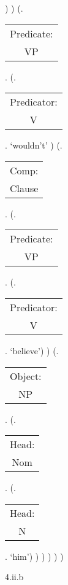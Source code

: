 \documentclass[12pt,letterpaper]{article}
\begin{document}
\begin{figure}
\begin{center}
\begin{parsetree}
			)
			)
			(.\begin{tabular}{c}Predicate:\\VP\end{tabular}.
			(.\begin{tabular}{c}Predicator:\\V\end{tabular}. `{wouldn't}' )
			(.\begin{tabular}{c}Comp:\\Clause\end{tabular}. 
			(.\begin{tabular}{c}Predicate:\\VP\end{tabular}. 
			(.\begin{tabular}{c}Predicator:\\V\end{tabular}. `believe')
			)
			(.\begin{tabular}{c}Object:\\NP\end{tabular}.
			(.\begin{tabular}{c}Head:\\Nom\end{tabular}.
			(.\begin{tabular}{c}Head:\\N\end{tabular}. `him')
			)
			)
			)
			)
			)
			
			\hfill \break\hfill \break
		\end{parsetree}
		4.ii.b
	\end{center}
\end{figure}
\end{document}
